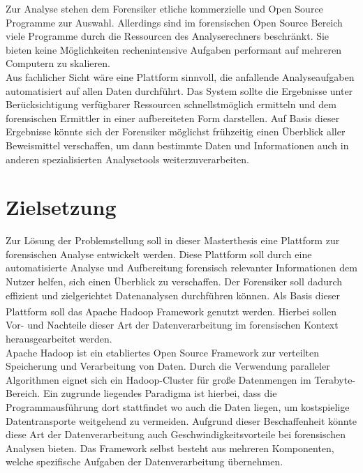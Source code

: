 \noindent
Zur Analyse stehen dem Forensiker etliche kommerzielle und Open Source Programme zur Auswahl. Allerdings sind im forensischen Open Source Bereich viele Programme durch die Ressourcen des Analyserechners beschränkt. Sie bieten keine Möglichkeiten rechenintensive Aufgaben performant auf mehreren Computern zu skalieren.\\

\noindent
Aus fachlicher Sicht wäre eine Plattform sinnvoll, die anfallende Analyseaufgaben automatisiert auf allen Daten durchführt. Das System sollte die Ergebnisse unter Berücksichtigung verfügbarer Ressourcen schnellstmöglich ermitteln und dem forensischen Ermittler in einer aufbereiteten Form darstellen. Auf Basis dieser Ergebnisse könnte sich der Forensiker möglichst frühzeitig einen Überblick aller Beweismittel verschaffen, um dann bestimmte Daten und Informationen auch in anderen spezialisierten Analysetools weiterzuverarbeiten. 

\section{Zielsetzung}
Zur Lösung der Problemstellung soll in dieser Masterthesis eine Plattform zur forensischen Analyse entwickelt werden. Diese Plattform soll durch eine automatisierte Analyse und Aufbereitung forensisch relevanter Informationen dem Nutzer helfen, sich einen Überblick zu verschaffen. Der Forensiker soll dadurch effizient und zielgerichtet Datenanalysen durchführen können. Als Basis dieser Plattform soll das Apache Hadoop\textsuperscript{\textregistered} Framework genutzt werden. Hierbei sollen Vor- und Nachteile dieser Art der Datenverarbeitung im forensischen Kontext herausgearbeitet werden.\\ 

\noindent
Apache Hadoop ist ein etabliertes Open Source Framework zur verteilten Speicherung und Verarbeitung von Daten. Durch die Verwendung paralleler Algorithmen eignet sich ein Hadoop-Cluster für große Datenmengen im Terabyte-Bereich. Ein zugrunde liegendes Paradigma ist hierbei, dass die Programmausführung dort stattfindet wo auch die Daten liegen, um kostspielige Datentransporte weitgehend zu vermeiden. Aufgrund dieser Beschaffenheit könnte diese Art der Datenverarbeitung auch Geschwindigkeitsvorteile bei forensischen Analysen bieten. Das Framework selbst besteht aus mehreren Komponenten, welche spezifische Aufgaben der Datenverarbeitung übernehmen. \\

